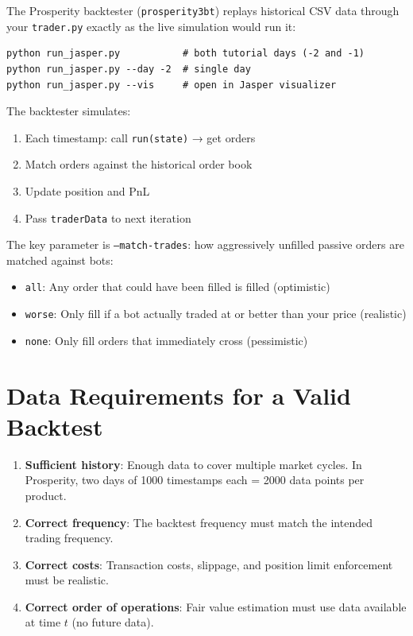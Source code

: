 \documentclass[12pt,a4paper,openany]{report}
\theoremstyle{definition}
\begin{document}
The Prosperity backtester (\texttt{prosperity3bt}) replays historical CSV data through your \texttt{trader.py} exactly as the live simulation would run it:

\begin{lstlisting}[caption={Running a backtest with prosperity3bt}]
python run_jasper.py           # both tutorial days (-2 and -1)
python run_jasper.py --day -2  # single day
python run_jasper.py --vis     # open in Jasper visualizer
\end{lstlisting}

The backtester simulates:
\begin{enumerate}[label=\arabic*.]
  \item Each timestamp: call \texttt{run(state)} → get orders
  \item Match orders against the historical order book
  \item Update position and PnL
  \item Pass \texttt{traderData} to next iteration
\end{enumerate}

The key parameter is \texttt{--match-trades}: how aggressively unfilled passive orders are matched against bots:
\begin{itemize}
  \item \texttt{all}: Any order that could have been filled is filled (optimistic)
  \item \texttt{worse}: Only fill if a bot actually traded at or better than your price (realistic)
  \item \texttt{none}: Only fill orders that immediately cross (pessimistic)
\end{itemize}

\section{Data Requirements for a Valid Backtest}

\begin{enumerate}[label=\arabic*.]
  \item \textbf{Sufficient history}: Enough data to cover multiple market cycles. In Prosperity, two days of 1000 timestamps each = 2000 data points per product.
  \item \textbf{Correct frequency}: The backtest frequency must match the intended trading frequency.
  \item \textbf{Correct costs}: Transaction costs, slippage, and position limit enforcement must be realistic.
  \item \textbf{Correct order of operations}: Fair value estimation must use data available at time $t$ (no future data).
\end{enumerate}
\end{document}
